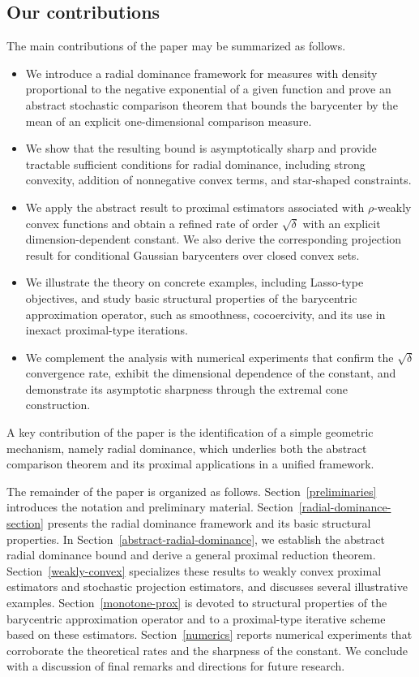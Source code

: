 \documentclass[11pt]{article}
\newcommand{\1}{\mathds{1}}
\theoremstyle{definition}
\theoremstyle{remark}
\theoremstyle{definition}
\begin{document}
\subsection*{Our contributions}

The main contributions of the paper may be summarized as follows.

\begin{itemize}
    \item We introduce a radial dominance framework for measures with
    density proportional to the negative exponential of a given function and prove an abstract
    stochastic comparison theorem that bounds the barycenter by the mean of
    an explicit one-dimensional comparison measure.

    \item We show that the resulting bound is asymptotically sharp and
    provide tractable sufficient conditions for radial dominance,
    including strong convexity, addition of nonnegative convex terms, and
    star-shaped constraints.

    \item We apply the abstract result to proximal estimators associated
    with \(\rho\)-weakly convex functions and obtain a refined rate of
    order \(\sqrt{\delta}\) with an explicit dimension-dependent constant.
    We also derive the corresponding projection result for conditional
    Gaussian barycenters over closed convex sets.

    \item We illustrate the theory on concrete examples, including
    Lasso-type objectives, and study basic structural properties of the
    barycentric approximation operator, such as smoothness, cocoercivity,
    and its use in inexact proximal-type iterations.
\item We complement the analysis with numerical experiments that
    confirm the $\sqrt{\delta}$ convergence rate, exhibit the dimensional
    dependence of the constant, and demonstrate its asymptotic sharpness
    through the extremal cone construction.
\end{itemize}
A key contribution of the paper is the identification of a simple geometric mechanism, namely radial dominance, which underlies both the abstract comparison theorem and its proximal applications in a unified framework.

The remainder of the paper is organized as follows.
Section~\ref{preliminaries} introduces the notation and preliminary material.
Section~\ref{radial-dominance-section} presents the radial dominance framework and its basic structural properties.
In Section~\ref{abstract-radial-dominance}, we establish the abstract radial dominance bound and derive a general proximal reduction theorem.
Section~\ref{weakly-convex} specializes these results to weakly convex proximal estimators and stochastic projection estimators, and discusses several illustrative examples.
Section~\ref{monotone-prox} is devoted to structural properties of the barycentric approximation operator and to a proximal-type iterative scheme based on these estimators. Section~\ref{numerics} reports numerical experiments that corroborate the theoretical rates and the sharpness of the constant.
We conclude with a discussion of final remarks and directions for future research.
\end{document}
